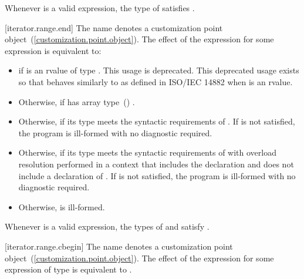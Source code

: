 {\pnum
\remark Whenever  is a valid expression, the
type of  satisfies .

[iterator.range.end]{}
\pnum
The name  denotes a customization point
object~(\ref{customization.point.object}). The effect of the expression
 for some expression  is equivalent to:

\begin{itemize}
\item
   if  is an rvalue of
  type . This usage is deprecated.
  \enternote This deprecated usage exists so that
   behaves similarly to 
  as defined in ISO/IEC 14882 when  is an rvalue. \exitnote

\item
  Otherwise,  if  has array
  type~() .

\item
  Otherwise,  if its type  meets the
  syntactic requirements of
  . If
   is not satisfied, the program is ill-formed with
  no diagnostic required.

\item
  Otherwise,  if its type  meets the
  syntactic requirements of
   with overload
  resolution performed in a context that includes the declaration
   and does not include
  a declaration of . If  is not
  satisfied, the program is ill-formed with no diagnostic required.

\item
  Otherwise,  is ill-formed.
\end{itemize}

\pnum
\remark Whenever  is a valid expression, the
types of  and  satisfy
.

[iterator.range.cbegin]{}
\pnum
The name  denotes a customization point
object~(\ref{customization.point.object}). The effect of the expression
 for some expression  of type 
is equivalent to .

}
